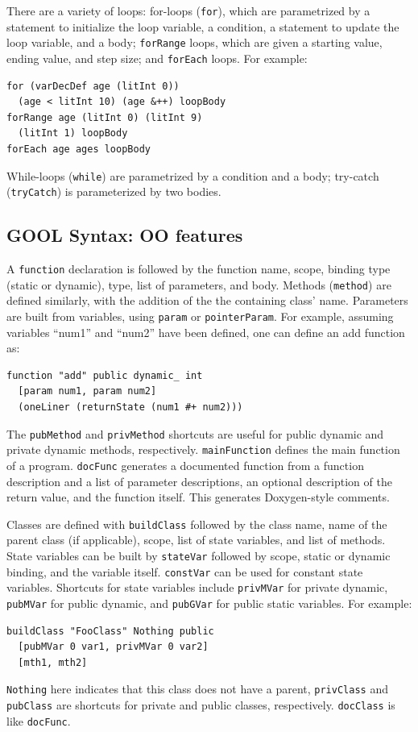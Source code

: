 \documentclass[sigplan,review,anonymous,prologue,dvipsnames]{acmart}
\begin{document}
There are a variety of loops: for-loops (\verb|for|), which are
parametrized by a statement to
initialize the loop variable, a condition, a statement to update the loop
variable, and a body; \verb|forRange| loops, which are given a
starting value, ending value, and step size; and \verb|forEach|
loops.  For example:
\begin{lstlisting}
for (varDecDef age (litInt 0))
  (age < litInt 10) (age &++) loopBody
forRange age (litInt 0) (litInt 9)
  (litInt 1) loopBody
forEach age ages loopBody
\end{lstlisting}
While-loops (\verb|while|) are parametrized by a condition and a body; 
try-catch (\verb|tryCatch|) is parameterized by two bodies.

\subsection{GOOL Syntax: OO features}

A \verb|function| declaration is followed by the function
name, scope, binding type (static or dynamic), type, list of parameters, and
body. Methods (\verb|method|) are defined similarly, with the addition of the
the containing class' name.  Parameters are built from
variables, using \verb|param| or \verb|pointerParam|. For example, assuming
variables ``num1'' and ``num2'' have been defined, one can define an
\textsf{add} function as:
\begin{lstlisting}
function "add" public dynamic_ int
  [param num1, param num2]
  (oneLiner (returnState (num1 #+ num2)))
\end{lstlisting}
The  \verb|pubMethod| and \verb|privMethod| shortcuts are useful for public
dynamic and private dynamic methods, respectively. \verb|mainFunction|
defines the main function of a program. \verb|docFunc|
generates a documented function from a function description and
a list of parameter descriptions, an optional description of the return
value, and the function itself.  This generates Doxygen-style comments.

Classes are defined with \verb|buildClass| followed by the class name, name of
the parent class (if applicable), scope, list of state variables, and list of
methods. State variables can be built by \verb|stateVar| followed by scope, 
static or dynamic binding, and the variable itself.  \verb|constVar| can be 
used for constant state
variables. Shortcuts for state variables include \verb|privMVar| for private
dynamic, \verb|pubMVar| for public dynamic, and \verb|pubGVar| for public
static variables. For example:
\begin{lstlisting}
buildClass "FooClass" Nothing public
  [pubMVar 0 var1, privMVar 0 var2]
  [mth1, mth2]
\end{lstlisting}
\verb|Nothing| here indicates that this class does not have a parent,
\verb|privClass| and \verb|pubClass| are shortcuts for private and public
classes, respectively. \verb|docClass| is like \verb|docFunc|.
\end{document}
